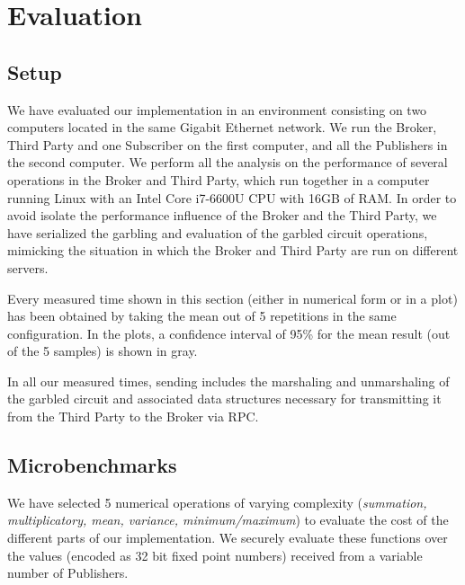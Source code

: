 \section{Evaluation}
\label{sec:evaluation}

\subsection{Setup}

We have evaluated our implementation in an environment consisting on two
computers located in the same Gigabit Ethernet network.  We run the Broker,
Third Party and one Subscriber on the first computer, and all the Publishers in
the second computer.  We perform all the analysis on the performance of several
operations in the Broker and Third Party, which run together in a computer
running Linux with an Intel Core i7-6600U CPU with 16GB of RAM.  In order to
avoid isolate the performance influence of the Broker and the Third Party, we
have serialized the garbling and evaluation of the garbled circuit operations,
mimicking the situation in which the Broker and Third Party are run on
different servers.

Every measured time shown in this section (either in numerical form or in a
plot) has been obtained by taking the mean out of 5 repetitions in the same
configuration.  In the plots, a confidence interval of 95\% for the mean result
(out of the 5 samples) is shown in gray.

In all our measured times, sending includes the marshaling and unmarshaling of
the garbled circuit and associated data structures necessary for transmitting
it from the Third Party to the Broker via RPC.

\subsection{Microbenchmarks}

We have selected 5 numerical operations of varying complexity (\emph{summation,
multiplicatory, mean, variance, minimum/maximum}) to evaluate the cost of the
different parts of our implementation.  We securely evaluate these functions
over the values (encoded as 32 bit fixed point numbers) received from a
variable number of Publishers.

